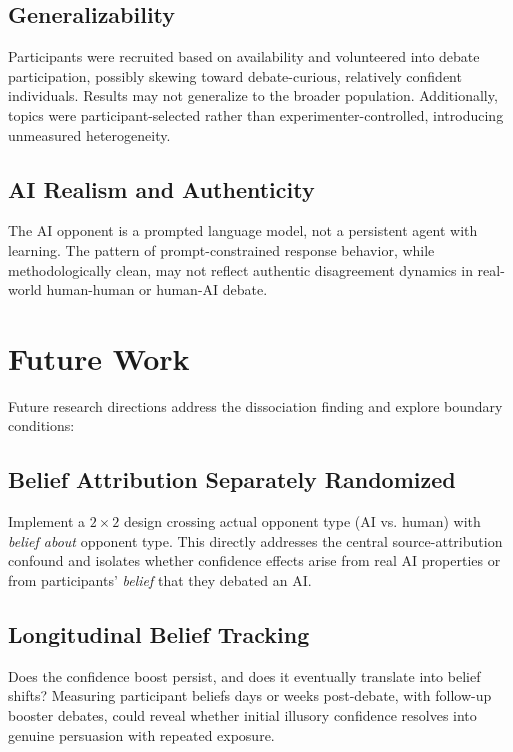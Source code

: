 \subsection{Generalizability}

Participants were recruited based on availability and volunteered into debate participation, possibly skewing toward
debate-curious, relatively confident individuals. Results may not generalize to the broader population.
Additionally, topics were participant-selected rather than experimenter-controlled, introducing unmeasured heterogeneity.

\subsection{AI Realism and Authenticity}

The AI opponent is a prompted language model, not a persistent agent with learning. The pattern of
prompt-constrained response behavior, while methodologically clean, may not reflect authentic disagreement dynamics
in real-world human-human or human-AI debate.

\pagebreak
\section{Future Work}

Future research directions address the dissociation finding and explore boundary conditions:

\subsection{Belief Attribution Separately Randomized}

Implement a $2 \times 2$ design crossing actual opponent type (AI vs. human) with \textit{belief about} opponent type.
This directly addresses the central source-attribution confound and isolates whether confidence effects arise
from real AI properties or from participants' \textit{belief} that they debated an AI.

\subsection{Longitudinal Belief Tracking}

Does the confidence boost persist, and does it eventually translate into belief shifts?
Measuring participant beliefs days or weeks post-debate, with follow-up booster debates,
could reveal whether initial illusory confidence resolves into genuine persuasion with repeated exposure.

